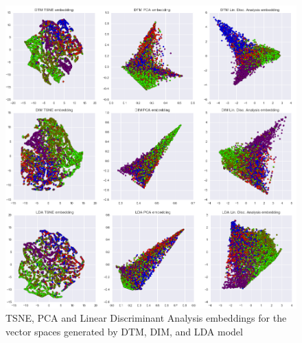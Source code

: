 \begin{figure}[!htb]
\centering
\includegraphics[width=130mm,scale=0.65]{Figures/Clusters}
\decoRule
\caption[clusterembeds]{TSNE, PCA and Linear Discriminant Analysis embeddings for the vector spaces generated by DTM, DIM, and LDA model}
\label{fig:clusterembeds}
\end{figure}
